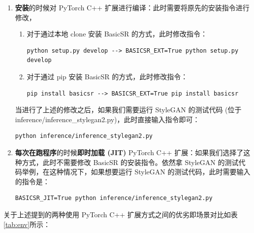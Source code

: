\documentclass[../main.tex]{subfiles}
\begin{document}
\begin{enumerate}
    \item \textbf{安装}的时候对 PyTorch C++ 扩展进行编译：此时需要将原先的安装指令进行修改，
    \begin{enumerate}
        \item 对于通过本地 clone 安装 BasicSR 的方式，此时修改指令：
        \begin{verbatim}
python setup.py develop --> BASICSR_EXT=True python setup.py develop
        \end{verbatim}
        \item 对于通过 pip 安装 BasicSR 的方式，此时修改指令：
        \begin{verbatim}
pip install basicsr --> BASICSR_EXT=True pip install basicsr
        \end{verbatim}
    \end{enumerate}
    当进行了上述的修改之后，如果我们需要运行 StyleGAN 的测试代码 (位于inference/inference\_stylegan2.py)，此时直接输入指令即可：
    \begin{verbatim}
python inference/inference_stylegan2.py
        \end{verbatim}

    \item \textbf{每次在跑程序}的时候\textbf{即时加载 (JIT)} PyTorch C++ 扩展：如果我们选择了这种方式，此时不需要修改 BasicSR 的安装指令。依然拿 StyleGAN 的测试代码举例，在这种情况下，如果想要运行 StyleGAN 的测试代码，此时需要输入的指令是：
    \begin{verbatim}
BASICSR_JIT=True python inference/inference_stylegan2.py
    \end{verbatim}

\end{enumerate}


关于上述提到的两种使用 PyTorch C++ 扩展方式之间的优劣即场景对比如表\ref{tab:env}所示：
\end{document}
